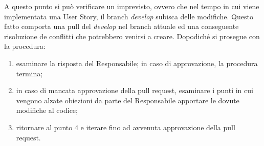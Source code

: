 A questo punto si può verificare un imprevisto, ovvero che nel tempo in cui viene implementata una User Story, il branch \emph{develop} subisca delle modifiche. Questo fatto comporta una pull del \emph{develop} nel branch attuale ed una conseguente risoluzione de conflitti che potrebbero venirsi a creare. Dopodiché si prosegue con la procedura:
\begin{enumerate}[resume]
	\item esaminare la risposta del Responsabile; in caso di approvazione, la procedura termina;
	\item in caso di mancata approvazione della pull request, esaminare i punti in cui vengono alzate obiezioni da parte del Responsabile apportare le dovute modifiche al codice;
	\item ritornare al punto 4 e iterare fino ad avvenuta approvazione della pull request.
\end{enumerate}


